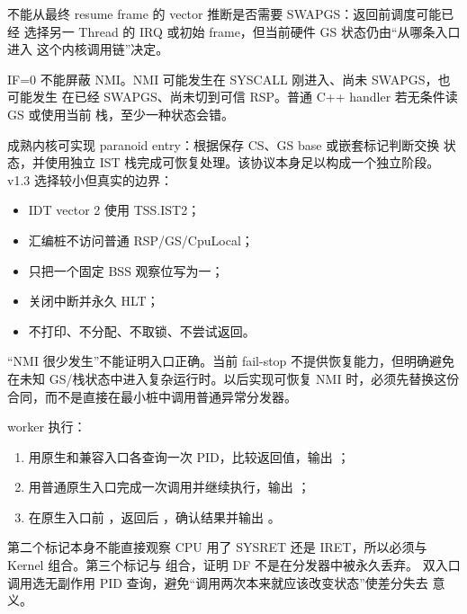不能从最终 resume frame 的 vector 推断是否需要 SWAPGS：返回前调度可能已经
选择另一 Thread 的 IRQ 或初始 frame，但当前硬件 GS 状态仍由“从哪条入口进入
这个内核调用链”决定。

IF=0 不能屏蔽 NMI。NMI 可能发生在 SYSCALL 刚进入、尚未 SWAPGS，也可能发生
在已经 SWAPGS、尚未切到可信 RSP。普通 C++ handler 若无条件读 GS 或使用当前
栈，至少一种状态会错。

成熟内核可实现 paranoid entry：根据保存 CS、GS base 或嵌套标记判断交换
状态，并使用独立 IST 栈完成可恢复处理。该协议本身足以构成一个独立阶段。
v1.3 选择较小但真实的边界：

\begin{itemize}
  \item IDT vector 2 使用 TSS.IST2；
  \item 汇编桩不访问普通 RSP/GS/CpuLocal；
  \item 只把一个固定 BSS 观察位写为一；
  \item 关闭中断并永久 HLT；
  \item 不打印、不分配、不取锁、不尝试返回。
\end{itemize}

\begin{failurebox}
“NMI 很少发生”不能证明入口正确。当前 fail-stop 不提供恢复能力，但明确避免
在未知 GS/栈状态中进入复杂运行时。以后实现可恢复 NMI 时，必须先替换这份
合同，而不是直接在最小桩中调用普通异常分发器。
\end{failurebox}

worker 执行：

\begin{enumerate}[label=\arabic*.]
  \item 用原生和兼容入口各查询一次 PID，比较返回值，输出
    ；
  \item 用普通原生入口完成一次调用并继续执行，输出
    ；
  \item 在原生入口前 ，返回后 ，确认结果并输出
    。
\end{enumerate}

第二个标记本身不能直接观察 CPU 用了 SYSRET 还是 IRET，所以必须与 Kernel
 组合。第三个标记与
 组合，证明 DF 不是在分发器中被永久丢弃。
双入口调用选无副作用 PID 查询，避免“调用两次本来就应该改变状态”使差分失去
意义。

